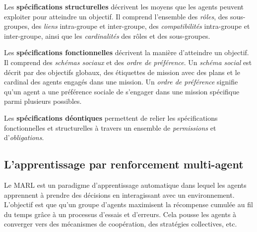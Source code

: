 \documentclass[demonstration]{jfsma}
\begin{document}
Les \textbf{spécifications structurelles} décrivent les moyens que les agents peuvent exploiter pour atteindre un objectif. Il comprend l'ensemble des \emph{rôles}, des sous-groupes, des \emph{liens} intra-groupe et inter-groupe, des \emph{compatibilités} intra-groupe et inter-groupe, ainsi que les \emph {cardinalités} des rôles et des sous-groupes.

Les \textbf{spécifications fonctionnelles} décrivent la manière d'atteindre un objectif. Il comprend des \emph{schémas sociaux} et des \emph{ordre de préférence}.
Un \emph{schéma social} est décrit par des objectifs globaux, des étiquettes de mission avec des plans et le cardinal des agents engagés dans une mission. Un \emph{ordre de préférence} signifie qu'un agent a une préférence sociale de s'engager dans une mission spécifique parmi plusieurs possibles.

Les \textbf{spécifications déontiques} permettent de relier les spécifications fonctionnelles et structurelles à travers un ensemble de \emph{permissions} et d'\emph{obligations}.


\subsection{L'apprentissage par renforcement multi-agent}

Le MARL est un paradigme d'apprentissage automatique dans lequel les agents apprennent à prendre des décisions en interagissant avec un environnement. L’objectif est que qu'un groupe d'agents maximisent la récompense cumulée au fil du temps grâce à un processus d’essais et d’erreurs.
Cela pousse les agents à converger vers des mécanismes de coopération, des stratégies collectives, etc.
\end{document}

